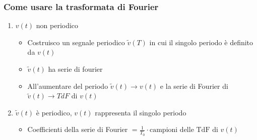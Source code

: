 \documentclass[a4paper]{article}
\begin{document}
\subsubsection{Come usare la trasformata di Fourier}
\begin{enumerate}
  \item \( v(t) \) non periodico
    \begin{itemize}
      \item Costruisco un segnale periodico \( \tilde{v}(T) \) in cui il singolo periodo
        è definito da \( v(t) \)
      \item \( \tilde{v}(t) \) ha serie di fourier
      \item All'aumentare del periodo $\tilde{v}(t) \to v(t)$ e la serie di Fourier di
        \( \tilde{v}(t) \to TdF \) di \( v(t) \) 
    \end{itemize}

  \item \( \tilde{v}(t) \) è periodico, \( v(t) \) rappresenta il singolo periodo
    \begin{itemize}
      \item Coefficienti della serie di Fourier \( = \frac{1}{T_0} \cdot \text{campioni delle
        TdF di } v(t) \)
    \end{itemize}


\end{enumerate}
\end{document}
